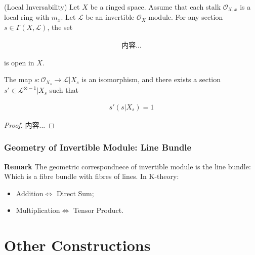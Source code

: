 \documentclass[Total.tex]{subfiles}
\begin{document}
					\begin{lemma}
						(Local Inversability) Let $X$ be a ringed space. Assume that each stalk $\mathcal{O}_{X,x}$ is a local ring with $m_x$. Let $\mathcal{L}$ be an invertible $\mathcal{O}_X$-module. For any section $s\in \Gamma(X,\mathcal{L})$, the set
						
						\begin{gather*}
							内容...
						\end{gather*}
						
						is open in $X$. 
						
						The map $s:\mathcal{O}_{X_s}\rightarrow \mathcal{L}|X_s$ is an isomorphism, and there exists a section $s'\in \mathcal{L}^{\otimes -1}|X_s$ such that
						
						\begin{gather*}
							s'(s|X_s)=1
						\end{gather*}
					\end{lemma}
					
					\begin{proof}
						内容...
					\end{proof}
				\subsubsection{Geometry of Invertible Module: Line Bundle}
					
					\textbf{Remark} The geometric correspondnece of invertible module is the line bundle: Which is a fibre bundle with fibres of lines. In K-theory:
					
					\begin{itemize}
						\item Addition$\Leftrightarrow$ Direct Sum;
						\item Multiplication$\Leftrightarrow$ Tensor Product.
					\end{itemize}
		\section{Other Constructions}
		
\end{document}
